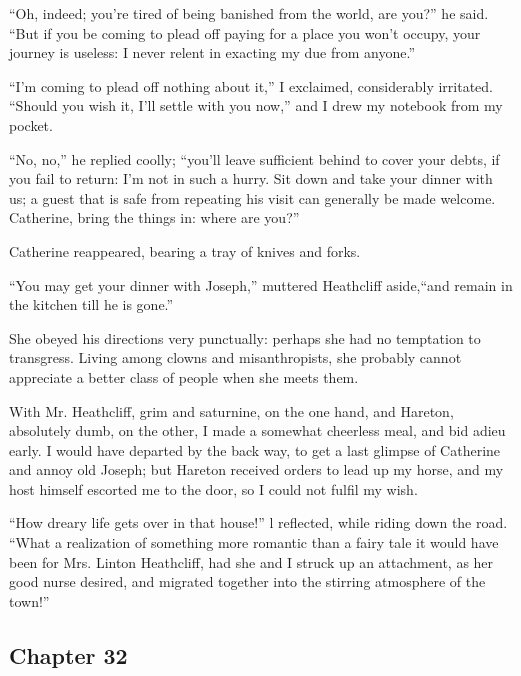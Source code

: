 \par “Oh, indeed; you're tired of being banished from the world, are you?” he said. “But if you be coming to plead off paying for a place you won't occupy, your journey is useless: I never relent in exacting my due from anyone.”
\par “I'm coming to plead off nothing about it,” I exclaimed, considerably irritated. “Should you wish it, I'll settle with you now,” and I drew my notebook from my pocket.
\par “No, no,” he replied coolly; “you'll leave sufficient behind to cover your debts, if you fail to return: I'm not in such a hurry. Sit down and take your dinner with us; a guest that is safe from repeating his visit can generally be made welcome. Catherine, bring the things in: where are you?”
\par Catherine reappeared, bearing a tray of knives and forks.
\par “You may get your dinner with Joseph,” muttered Heathcliff aside,“and remain in the kitchen till he is gone.”
\par She obeyed his directions very punctually: perhaps she had no temptation to transgress. Living among clowns and misanthropists, she probably cannot appreciate a better class of people when she meets them.
\par With Mr. Heathcliff, grim and saturnine, on the one hand, and Hareton, absolutely dumb, on the other, I made a somewhat cheerless meal, and bid adieu early. I would have departed by the back way, to get a last glimpse of Catherine and annoy old Joseph; but Hareton received orders to lead up my horse, and my host himself escorted me to the door, so I could not fulfil my wish.
\par “How dreary life gets over in that house!” l reflected, while riding down the road. “What a realization of something more romantic than a fairy tale it would have been for Mrs. Linton Heathcliff, had she and I struck up an attachment, as her good nurse desired, and migrated together into the stirring atmosphere of the town!”


\subsection*{Chapter 32}

